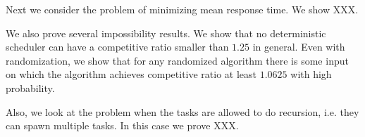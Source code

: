 Next we consider the problem of minimizing mean response time.
We show XXX.

We also prove several impossibility results.
We show that no deterministic scheduler can have a
competitive ratio smaller than $1.25$ in general.
Even with randomization, we show that for any randomized
algorithm there is some input on which the algorithm achieves
competitive ratio at least $1.0625$ with high probability.

Also, we look at the problem when the tasks are allowed to do
recursion, i.e. they can spawn multiple tasks. In this case we
prove XXX.
